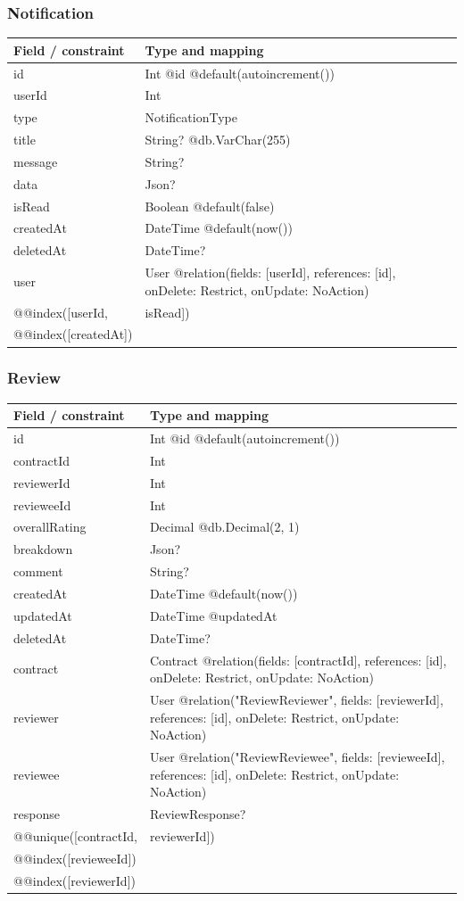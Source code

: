 \subsubsection{Notification}
\begin{longtable}{|L{3.3cm}|L{10.8cm}|}\hline
Field / constraint & Type and mapping \\ \hline
id & Int @id @default(autoincrement()) \\ \hline
userId & Int \\ \hline
type & NotificationType \\ \hline
title & String? @db.VarChar(255) \\ \hline
message & String? \\ \hline
data & Json? \\ \hline
isRead & Boolean @default(false) \\ \hline
createdAt & DateTime @default(now()) \\ \hline
deletedAt & DateTime? \\ \hline
user & User @relation(fields: [userId], references: [id], onDelete: Restrict, onUpdate: NoAction) \\ \hline
@@index([userId, & isRead]) \\ \hline
@@index([createdAt]) &  \\ \hline
\end{longtable}
\subsubsection{Review}
\begin{longtable}{|L{3.3cm}|L{10.8cm}|}\hline
Field / constraint & Type and mapping \\ \hline
id & Int @id @default(autoincrement()) \\ \hline
contractId & Int \\ \hline
reviewerId & Int \\ \hline
revieweeId & Int \\ \hline
overallRating & Decimal @db.Decimal(2, 1) \\ \hline
breakdown & Json? \\ \hline
comment & String? \\ \hline
createdAt & DateTime @default(now()) \\ \hline
updatedAt & DateTime @updatedAt \\ \hline
deletedAt & DateTime? \\ \hline
contract & Contract @relation(fields: [contractId], references: [id], onDelete: Restrict, onUpdate: NoAction) \\ \hline
reviewer & User @relation("ReviewReviewer", fields: [reviewerId], references: [id], onDelete: Restrict, onUpdate: NoAction) \\ \hline
reviewee & User @relation("ReviewReviewee", fields: [revieweeId], references: [id], onDelete: Restrict, onUpdate: NoAction) \\ \hline
response & ReviewResponse? \\ \hline
@@unique([contractId, & reviewerId]) \\ \hline
@@index([revieweeId]) &  \\ \hline
@@index([reviewerId]) &  \\ \hline
\end{longtable}
